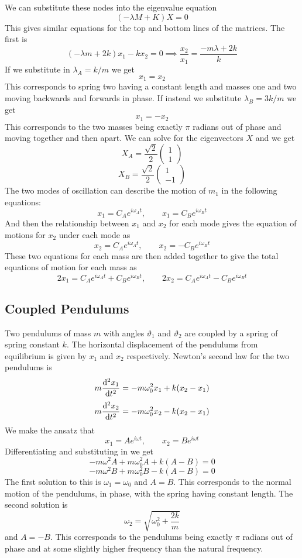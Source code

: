 \documentclass{article}
\begin{document}
    We can substitute these nodes into the eigenvalue equation
    \[(-\lambda M + K)X = 0\]
    This gives similar equations for the top and bottom lines of the matrices.
    The first is
    \[(-\lambda m + 2k)x_1 -kx_2 = 0\implies \frac{x_2}{x_1} = \frac{-m\lambda + 2k}{k}\]
    If we substitute in \(\lambda_A = k/m\) we get
    \[x_1 = x_2\]
    This corresponds to spring two having a constant length and masses one and two moving backwards and forwards in phase.
    If instead we substitute \(\lambda_B = 3k/m\) we get
    \[x_1 = -x_2\]
    This corresponds to the two masses being exactly \(\pi\) radians out of phase and moving together and then apart.
    We can solve for the eigenvectors \(X\) and we get
    \[X_A = \frac{\sqrt{2}}{2}\begin{pmatrix} 1 \\ 1 \end{pmatrix}\]
    \[X_B = \frac{\sqrt{2}}{2}\begin{pmatrix} 1 \\ -1 \end{pmatrix}\]
    The two modes of oscillation can describe the motion of \(m_1\) in the following equations:
    \[x_1 = C_Ae^{i\omega_A t},\qquad x_1 = C_Be^{i\omega_B t}\]
    And then the relationship between \(x_1\) and \(x_2\) for each mode gives the equation of motions for \(x_2\) under each mode as
    \[x_2 = C_Ae^{i\omega_A t},\qquad x_2 = -C_Be^{i\omega_B t}\]
    These two equations for each mass are then added together to give the total equations of motion for each mass as
    \[2x_1 = C_Ae^{i\omega_A t} + C_Be^{i\omega_B t},\qquad 2x_2 = C_Ae^{i\omega_A t} - C_Be^{i\omega_B t}\]
    
    \subsection{Coupled Pendulums}
    Two pendulums of mass \(m\) with angles \(\vartheta_1\) and \(\vartheta_2\) are coupled by a spring of spring constant \(k\).
    The horizontal displacement of the pendulums from equilibrium is given by \(x_1\) and \(x_2\) respectively.
    Newton's second law for the two pendulums is
    \[m\dv[2]{x_1}{t} = -m\omega_0^2x_1 + k(x_2 - x_1)\]
    \[m\dv[2]{x_2}{t} = -m\omega_0^2x_2 - k(x_2 - x_1)\]
    We make the ansatz that
    \[x_1 = Ae^{i\omega t},\qquad x_2 = Be^{i\omega t}\]
    Differentiating and substituting in we get
    \[-m\omega^2 A + m\omega_0^2A + k(A - B) = 0\]
    \[-m\omega^2 B + m\omega_0^2 B - k(A - B) = 0\]
    The first solution to this is \(\omega_1 = \omega_0\) and \(A = B\).
    This corresponds to the normal motion of the pendulums, in phase, with the spring having constant length.
    The second solution is
    \[\omega_2 = \sqrt{\omega_0^2 + \frac{2k}{m}}\]
    and \(A = -B\).
    This corresponds to the pendulums being exactly \(\pi\) radians out of phase and at some slightly higher frequency than the natural frequency.
    
\end{document}
